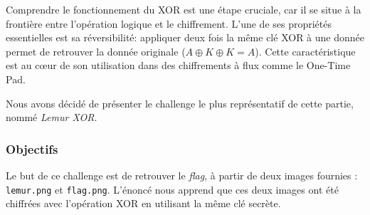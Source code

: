 \documentclass[12pt, a4paper]{article}
\begin{document}
        Comprendre le fonctionnement du XOR est une étape cruciale, car il se situe à la 
        frontière entre l'opération logique et le chiffrement. L'une de ses propriétés 
        essentielles est sa réversibilité: appliquer deux fois la même clé XOR 
        à une donnée permet de retrouver la donnée originale ($A \oplus K \oplus K = A$). 
        Cette caractéristique est au cœur de son utilisation dans des chiffrements à flux 
        comme le One-Time Pad.
        
        Nous avons décidé de présenter le challenge le plus représentatif de cette partie, 
        nommé \textit{Lemur XOR}.
        
        \subsubsection{Objectifs}
        
        Le but de ce challenge est de retrouver le \textit{flag}, à partir de deux images fournies : \texttt{lemur.png} et \texttt{flag.png}. L'énoncé nous apprend que ces deux images ont été chiffrées avec l'opération XOR en utilisant la même clé secrète.
\end{document}

